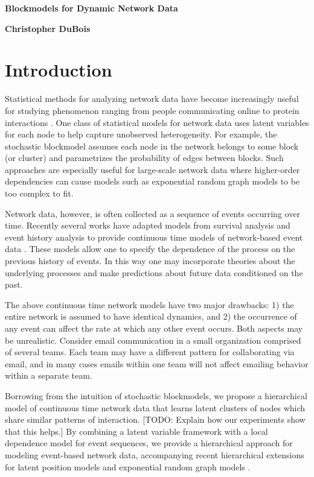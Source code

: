\documentclass[11pt]{article}
\begin{document}
 

 \centerline{\Large \bf Blockmodels for Dynamic Network Data} 
 \medskip
\centerline{\bf Christopher DuBois}
 \bigskip

\section{Introduction}

Statistical methods for analyzing network data have become increasingly useful for studying  phenomenon ranging from people communicating online to protein interactions \cite{Goldenberg2009}. One class of statistical models for network data uses latent variables for each node to help capture unobserved heterogeneity.  For example, the stochastic blockmodel \cite{Nowicki2001, Kemp} assumes each node in the network belongs to some block (or cluster) and parametrizes the probability of edges between blocks.   Such approaches are especially useful for large-scale network data where higher-order dependencies can cause models such as exponential random graph models to be too complex to fit.

Network data, however, is often collected as a sequence of events occurring over time.   Recently several works have adapted models from survival analysis and event history analysis to provide continuous time models of network-based event data \cite{Butts2008,Brandes2009,Perry2011,Stadtfeld2010,Stadtfeld2011,Opsahl2011,Vu2011,Vu2011a}.  These models allow one to specify the dependence of the process on the previous history of events.  In this way one may incorporate theories about the underlying processes and make predictions about future data conditioned on the past.

The above continuous time network models have two major drawbacks: 1) the entire network is assumed to have identical dynamics, and 2) the occurrence of any event can affect the rate at which any other event occurs.  Both aspects may be unrealistic.  Consider email communication in a small organization comprised of several teams.  Each team may have a different pattern for collaborating via email, and in many cases emails within one team will not affect emailing behavior within a separate team.

Borrowing from the intuition of stochastic blockmodels, we propose a hierarchical model of continuous time network data that learns latent clusters of nodes which share similar patterns of interaction.  [TODO: Explain how our experiments show that this helps.]  By combining a latent variable framework with a local dependence model for event sequences, we provide a hierarchical approach for modeling event-based network data, accompanying recent hierarchical extensions for latent position models \cite{Handcock2007} and exponential random graph models \cite{Schweinberger2011}.
  
\end{document}
